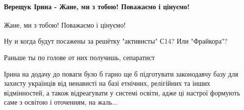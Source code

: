  
 
 
 
 
\paragraph{Верещук Ірина - Жане, ми з тобою! Поважаємо і цінуємо!}
\label{sec:13_08_2021.fb.belenjuk_zhan.1.napadenie.cmt.vereschuk_my_z_toboju}

\begin{itemize}
 

Жане, ми з тобою! Поважаємо і цінуємо!

\begin{itemize}
 
Ну и когда будут посажены за решётку "активисты" С14? Или "Фрайкора"?

 
Раньше ты по голове от них получишь, сепаратист

 

Ірина на додачу до поваги було б гарно ще б підготувати законодавчу базу для
захисту українців від ненависті на базі етнічних, релігійних та інших
відмінностей, а також відреагувати у системі освіти, адже ці настрої формують
саме з освітою і оточенням, на жаль...



\end{itemize}
\end{itemize}
